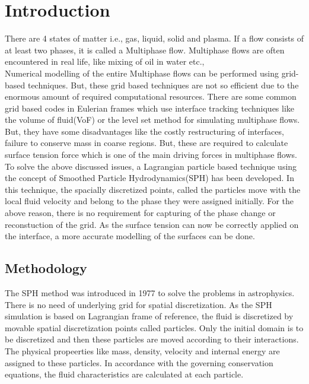 
\newcommand{\etas}{\ensuremath{\eta_{\mathrm{s}}}}


\chapter{Introduction}

There are 4 states of matter i.e., gas, liquid, solid and plasma. If a flow consists of at least two phases, it is called a 
Multiphase flow. Multiphase flows are often encountered in real life, like mixing of oil in water etc., \\

Numerical modelling of the entire Multiphase flows can be performed using grid-based techniques. But, these grid based techniques
are not so efficient due to the enormous amount of required computational resources. There are some common grid based codes in 
Eulerian frames which use interface tracking techniques like the volume of fluid(VoF) or the level set method for simulating multiphase
flows. But, they have some disadvantages like the costly restructuring of interfaces, failure to conserve mass in coarse regions.
 But, these are required to calculate surface tension force which is one of the main driving forces in multiphase flows.\\

To solve the above discussed issues, a Lagrangian particle based technique using the concept of Smoothed Particle Hydrodynamics(SPH)
has been developed. In this technique, the spacially discretized points, called the particles move with the local fluid velocity
and belong to the phase they were assigned initially. For the above reason, there is no requirement for capturing of the phase change or reconstuction
of the grid. As the surface tension can now be correctly applied on the interface, a more accurate modelling of the surfaces can
be done. \\

\section{Methodology}

The SPH method was introduced in 1977 to solve the problems in astrophysics. There is no need of underlying grid for spatial discretization. As the SPH simulation is based on Lagrangian frame of reference, the fluid is discretized by movable spatial discretization points called particles. Only the initial domain is to be discretized and then these particles are moved according to their interactions. The physical propeerties like mass, density, velocity and internal energy are assigned to these particles. In accordance with the governing conservation equations, the fluid characteristics are calculated at each particle.


